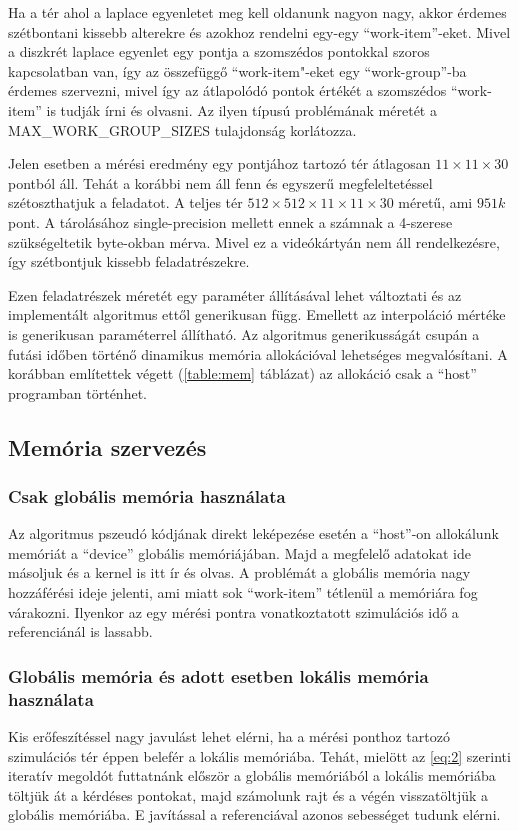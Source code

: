 		
		
		Ha a tér ahol a laplace egyenletet meg kell oldanunk nagyon nagy, akkor
		érdemes szétbontani kissebb alterekre és azokhoz rendelni egy-egy
		``work-item''-eket. Mivel a diszkrét laplace egyenlet egy pontja a szomszédos
		pontokkal szoros kapcsolatban van, így az összefüggő ``work-item"-eket egy
		``work-group''-ba érdemes szervezni, mivel így az átlapolódó pontok értékét a
		szomszédos ``work-item'' is tudják írni és olvasni. Az ilyen típusú
		problémának méretét a MAX\_WORK\_GROUP\_SIZES tulajdonság korlátozza.
		
		Jelen esetben a mérési eredmény egy pontjához tartozó tér átlagosan
		$11\times11\times30$ pontból áll.
		Tehát a korábbi nem áll fenn és egyszerű megfeleltetéssel szétoszthatjuk a
		feladatot.
		A teljes tér $512\times512\times11\times11\times30$ méretű, ami $951k$ pont.
		A tárolásához single-precision mellett ennek a számnak a 4-szerese
		szükségeltetik byte-okban mérva. Mivel ez a videókártyán nem áll
		rendelkezésre, így szétbontjuk kissebb feladatrészekre.
		
		Ezen feladatrészek méretét egy paraméter állításával lehet változtati és az
		implementált algoritmus ettől generikusan függ.
		Emellett az interpoláció mértéke is generikusan paraméterrel állítható.
		Az algoritmus generikusságát csupán a futási időben történő dinamikus memória
		allokációval lehetséges megvalósítani. A korábban említettek végett (\ref{table:mem} táblázat)
		az allokáció csak a ``host'' programban történhet.
	
	\subsection{Memória szervezés}
		\subsubsection{Csak globális memória használata}
		Az algoritmus pszeudó kódjának direkt leképezése esetén a ``host''-on
		allokálunk memóriát a ``device'' globális memóriájában.
		Majd a megfelelő adatokat ide másoljuk és a kernel is itt ír és olvas.
		A problémát a globális memória nagy hozzáférési ideje jelenti, ami miatt sok
		``work-item'' tétlenül a memóriára fog várakozni.
		Ilyenkor az egy mérési pontra vonatkoztatott szimulációs idő a
		referenciánál is lassabb.
		\subsubsection{Globális memória és adott esetben lokális memória használata}
		Kis erőfeszítéssel nagy javulást lehet elérni, ha a mérési ponthoz tartozó
		szimulációs tér éppen belefér a lokális memóriába.
		Tehát, mielött az \ref{eq:2} szerinti iteratív megoldót futtatnánk először a
		globális memóriából a lokális memóriába töltjük át a kérdéses pontokat, majd
		számolunk rajt és a végén visszatöltjük a globális memóriába.
		E javítással a referenciával azonos sebességet tudunk elérni.
